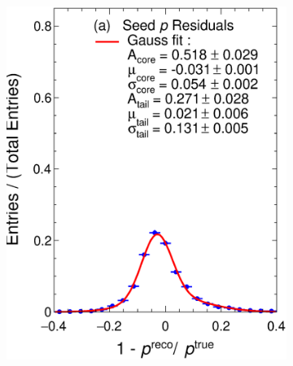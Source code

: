 \begin{figure}[t]
     \centering
     \begin{subfigure}[b]{0.48\textwidth}
         \centering
         \includegraphics[width=\textwidth]{figures/ch4-KF_NDGArLite/Toy/NoCorr/pRes_doublegauss.eps}
         \caption{}
         \label{fig:ToyResP_GArLite_NoCorr_Seed}
     \end{subfigure}
     \begin{subfigure}[b]{0.48\textwidth}
         \centering

\end{subfigure}
\end{figure}
